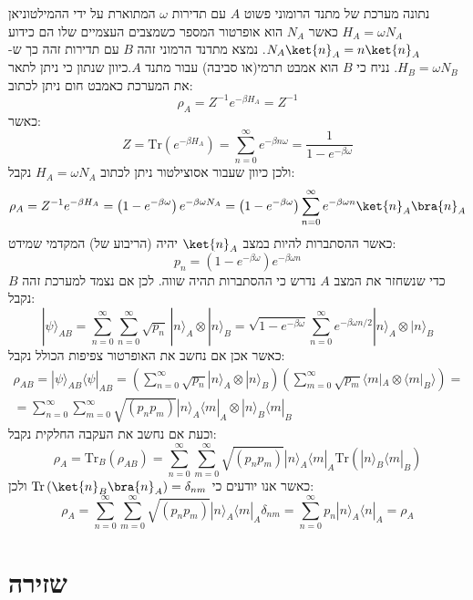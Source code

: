 \documentclass{tstextbook}
\begin{document}
\begin{example}
נתונה מערכת של מתנד הרומוני פשוט \(A\) עם תדירות \(\omega\) המתוארת על ידי ההמילטוניאן \(H_{A}=\omega N_{A}\) כאשר \(N_{A}\) הוא אופרטור המספר כשמצבים העצמיים שלו הם כידוע \(N_{A}\ket{n}_{A}=n\ket{n}_{A}\). נמצא מתדנד הרמוני זהה \(B\) עם תדירות זהה כך ש-\(H_{B}=\omega N_{B}\). נניח כי \(B\) הוא אמבט תרמי(או סביבה) עבור מתנד \(A\).כיוון שנתון כי ניתן לתאר את המערכת כאמבט חום ניתן לכתוב:
$$\rho_{A}=Z^{-1} e^{ -\beta H_{A} } =Z^{-1}$$
כאשר:
$$Z=\mathrm{Tr}\left( e^{ -\beta H_{A} } \right)=\sum_{n=0}^{\infty} e^{ -\beta n\omega }= \frac{1}{1-e^{ -\beta \omega }}$$
ולכן כיוון שעבור אסוצילטור ניתן לכתוב \(H_{A}=\omega N_{A}\) נקבל:
$$\rho_{A}=Z^{-1}e^{-\beta H_{A}}=\left( 1-e^{ -\beta \omega } \right)e^{ -\beta \omega N_{A} }=\left( 1-e^{ -\beta \omega } \right)\sum_{n=0}^{\infty} e^{ -\beta \omega n }\ket{n} _{A}\bra{n} _{A}$$
כאשר ההסתברות להיות במצב \(\ket{n}_{A}\) יהיה (הריבוע של) המקדמי שמידט:
$$p_{n}=\left(1-e^{-\beta\omega}\right)e^{-\beta\omega n}$$
כדי שנשחזר את המצב \(A\) נדרש כי ההסתברות תהיה שווה. לכן אם נצמד למערכת זהה \(B\) נקבל:
$$|\psi\rangle_{A B}=\sum_{n=0}^{\infty}\sum_{n=0}^{\infty}{\sqrt{p_{n}}}\,|n\rangle_{A}\otimes|n\rangle_{B}={\sqrt{1-e^{-\beta\omega}}}\sum_{n=0}^{\infty}e^{-\beta\omega n/2}|n\rangle_{A}\otimes|n\rangle_{B}$$
כאשר אכן אם נחשב את האופרטור צפיפות הכולל נקבל:
\begin{gather*}\rho_{AB}=|\psi\rangle_{AB}\langle\psi|_{AB}=(\sum_{n=0}^{\infty}\sqrt{p_{n}}|n\rangle_{A}\otimes|n\rangle_{B})(\sum_{m=0}^{\infty}\sqrt{p_{m}}\langle m|_{A}\otimes\langle m|_{B}\rangle)=\\=\sum_{n=0}^{\infty}\sum_{m=0}^{\infty}\sqrt{(p_{n}p_{m})}|n\rangle_{A}\langle m|_{A}\otimes|n\rangle_{B}\langle m|_{B} 
\end{gather*}
וכעת אם נחשב את העקבה החלקית נקבל:
$$\rho_{A}=\mathrm{Tr}_{B}(\rho_{A B})=\sum_{n=0}^{\infty}\sum_{m=0}^{\infty}\sqrt{(p_{n}p_{m})}|n\rangle_{A}\langle m|_{A}\mathrm{Tr}(|n\rangle_{B}\langle m|_{B})$$
כאשר אנו יודעים כי \(\mathrm{Tr}\left( \ket{n}_{B}\bra{n}_{A} \right)=\delta_{nm}\) ולכן:
$$\rho_{A}=\sum_{n=0}^{\infty}\sum_{m=0}^{\infty}\sqrt{(p_{n}p_{m})}|n\rangle_{A}\langle m|_{A}\delta_{n m}=\sum_{n=0}^{\infty}p_{n}|n\rangle_{A}\langle n|_{A}=\rho_{A}$$

\end{example}
\section{שזירה}
\end{document}
